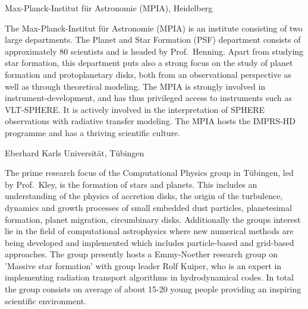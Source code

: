 \documentclass[10pt,fleqn,twoside,a4paper]{article}
\begin{document}
\begin{Emphasize}
Max-Planck-Institut f\"ur Astronomie (MPIA), Heidelberg\\
\end{Emphasize}
The Max-Planck-Institut f\"ur Astronomie (MPIA) is an institute consisting
of two large departments. The Planet and Star Formation (PSF) department
consists of approximately 80 scientists and is headed by Prof.~Henning.
Apart from studying star formation, this department puts also a strong focus
on the study of planet formation and protoplanetary disks, both from an
observational perspective as well as through theoretical modeling.  The MPIA
is strongly involved in instrument-development, and has thus privileged
access to instruments such as VLT-SPHERE. It is actively involved in the
interpretation of SPHERE observations with radiative transfer modeling. The
MPIA hosts the IMPRS-HD programme and has a thriving scientific culture.
\vspace{1em}

\begin{Emphasize}
Eberhard Karls Universit\"at, T\"ubingen\\
\end{Emphasize}
The prime research focus of the Computational Physics group in T\"ubingen,
led by Prof.~Kley, is the
formation of stars and planets. This includes an understanding
of the physics of accretion disks, the origin of the turbulence, dynamics
and growth processes of small embedded dust particles, planetesimal formation,
planet migration, circumbinary disks. Additionally the groups interest lie in the
field of computational astrophysics where new numerical methods are being developed and
implemented which includes particle-based and grid-based approaches.
The group presently hosts a Emmy-Noether research group on 'Massive star formation'
with group leader Rolf Kuiper, who is an expert in implementing
radiation transport algorithms in hydrodynamical codes. In total the
group consists on average of about 15-20 young people providing an
inspiring scientific environment. 
\vspace{1em}
\end{document}
